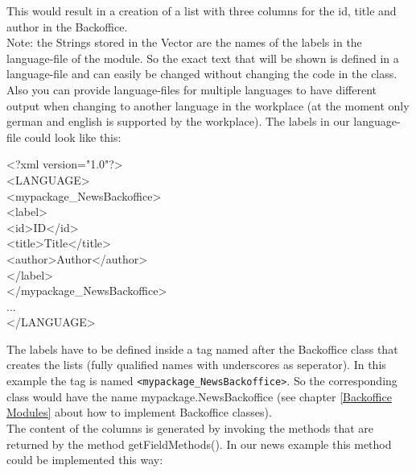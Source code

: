 This would result in a creation of a list with three columns for the id,
title and author in the Backoffice.\\
Note: the Strings stored in the Vector
are the names of the labels in the language-file of the module. So the exact
text that will be shown is defined in a language-file and can easily be 
changed without changing the code in the class. Also you can provide language-files
for multiple languages to have different output when changing to another language in
the workplace (at the moment only german and english is supported by the workplace).
The labels in our language-file could look like this:

\begin{xml}
<?xml version="1.0"?>\\
<LANGUAGE>\\
\xtaba    <mypackage\_NewsBackoffice>\\   
\xtabb      <label>\\
\xtabc        <id>ID</id>\\
\xtabc        <title>Title</title>\\
\xtabc        <author>Author</author>\\
\xtabb      </label>\\
\xtaba    </mypackage\_NewsBackoffice>\\
\xtaba    ...\\
</LANGUAGE>\\   
\end{xml}

The labels have to be defined inside a tag named after the Backoffice class that
creates the lists (fully qualified names with underscores as seperator).
In this example the tag is named \texttt{<mypackage\_NewsBackoffice>}. So the corresponding
class would have the name {\class mypackage.NewsBackoffice} (see chapter \ref{Backoffice Modules} 
about how to implement Backoffice classes).\\
The content of the columns is generated by invoking the methods that are returned
by the method {\meth getFieldMethods()}. In our news example this method could be implemented
this way:

